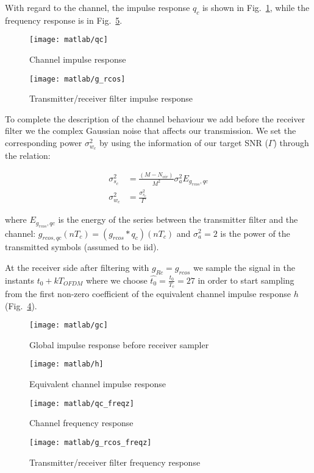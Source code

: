 \documentclass[a4paper,oneside]{article}
\begin{document}
With regard to the channel, the impulse response $q_c$ is shown in Fig.~\ref{plot:qc}, while the frequency response is in Fig.~\ref{plot:qc_freqz}.
\begin{figure}[htbp]
  \centering
  \texttt{[image: matlab/qc]}
  \caption{Channel impulse response}
  \label{plot:qc}
\end{figure}
\begin{figure}[htbp]
  \centering
  \texttt{[image: matlab/g\_rcos]}
  \caption{Transmitter/receiver filter impulse response}
  \label{plot:g_rcos}
\end{figure}

To complete the description of the channel behaviour we add before the receiver filter we the complex Gaussian noise that affects our transmission. We set the corresponding power $\sigma_{w_c}^2$ by using the information of our target SNR ($\Gamma$) through the relation:

\begin{align}
  \sigma^2_{s_c} &= \frac{(M-N_{vir})}{M^2}\sigma_{a}^2 E_{g_{rcos},qc} \\
\sigma_{w_c}^2 &= \frac{\sigma^2_{s_c}}{\Gamma}
\label{eq:var_OFDM}
\end{align}

where $E_{g_{rcos},qc}$ is the energy of the series between the transmitter filter and the channel: $g_{rcos,qc}(nT_c) = \left(g_{rcos}*q_c\right)(nT_c)$ and $\sigma_a^2 = 2$ is the power of the transmitted symbols (assumed to be iid).

At the receiver side after filtering with $g_{Rc} = g_{rcos}$ we sample the signal in the instants $t_0 + kT_{OFDM}$ where we choose $\hat{t_0} = \frac{t_0}{T_c} = 27$ in order to start sampling from the first non-zero coefficient of the equivalent channel impulse response $h$ (Fig.~\ref{plot:h}).
\begin{figure}[htbp]
  \centering
  \texttt{[image: matlab/gc]}
  \caption{Global impulse response before receiver sampler}
  \label{plot:gc}
\end{figure}
\begin{figure}[htbp]
  \centering
  \texttt{[image: matlab/h]}
  \caption{Equivalent channel impulse response}
  \label{plot:h}
\end{figure}
\begin{figure}[htbp]
  \centering
  \texttt{[image: matlab/qc\_freqz]}
  \caption{Channel frequency response}
  \label{plot:qc_freqz}
\end{figure}
\begin{figure}[htbp]
  \centering
  \texttt{[image: matlab/g\_rcos\_freqz]}
  \caption{Transmitter/receiver filter frequency response}
  \label{plot:g_rcos_freqz}
\end{figure}
\end{document}
